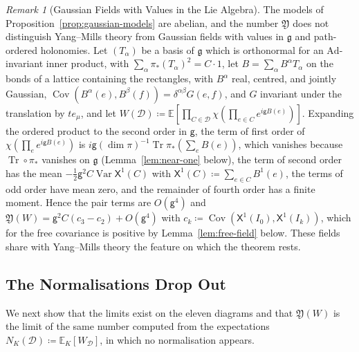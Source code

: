 \documentclass[11pt]{preprint}
\numberwithin{equation}{section}
\theoremstyle{definition}
\theoremstyle{remark}
\newtheorem{remark}[theorem]{Remark}
\theoremstyle{plain}
\begin{document}
\begin{remark}[Gaussian Fields with Values in the Lie Algebra]\label{rem:lie-gaussian}
The models of Proposition~\ref{prop:gaussian-models} are abelian, and the number $\mathfrak Y$ does not distinguish Yang--Mills theory from Gaussian fields with values in $\mathfrak g$ and path-ordered holonomies. Let $(T_\alpha)$ be a basis of $\mathfrak g$ which is orthonormal for an $\mathrm{Ad}$-invariant inner product, with $\sum_\alpha\pi_*(T_\alpha)^2 = C\cdot1$, let $B = \sum_\alpha B^\alpha T_\alpha$ on the bonds of a lattice containing the rectangles, with $B^\alpha$ real, centred, and jointly Gaussian, $\operatorname{Cov}(B^\alpha(e), B^\beta(f)) = \delta^{\alpha\beta}G(e, f)$, and $G$ invariant under the translation by $te_\mu$, and let $W(\mathcal D) \coloneqq \mathbb E[\prod_{C \in \mathcal D}\chi(\prod_{e \in C}e^{i\mathsf gB(e)})]$. Expanding the ordered product to the second order in $\mathsf g$, the term of first order of $\chi(\prod_ee^{i\mathsf gB(e)})$ is $i\mathsf g(\dim\pi)^{-1}\operatorname{Tr}\pi_*(\sum_eB(e))$, which vanishes because $\operatorname{Tr}\circ\pi_*$ vanishes on $\mathfrak g$ (Lemma~\ref{lem:near-one} below), the term of second order has the mean $-\frac12\mathsf g^2C\operatorname{Var}\mathsf X^1(C)$ with $\mathsf X^1(C) \coloneqq \sum_{e \in C}B^1(e)$, the terms of odd order have mean zero, and the remainder of fourth order has a finite moment. Hence the pair terms are $O(\mathsf g^4)$ and $\mathfrak Y(W) = \mathsf g^2C(c_3 - c_2) + O(\mathsf g^4)$ with $c_k \coloneqq \operatorname{Cov}(\mathsf X^1(I_0), \mathsf X^1(I_k))$, which for the free covariance is positive by Lemma~\ref{lem:free-field} below. These fields share with Yang--Mills theory the feature on which the theorem rests.
\end{remark}

\subsection{The Normalisations Drop Out}\label{sec:normalisations-drop-out}

We next show that the limits exist on the eleven diagrams and that $\mathfrak Y(W)$ is the limit of the same number computed from the expectations $N_K(\mathcal D) \coloneqq \mathbb E_K[W_{\mathcal D}]$, in which no normalisation appears.
\end{document}
